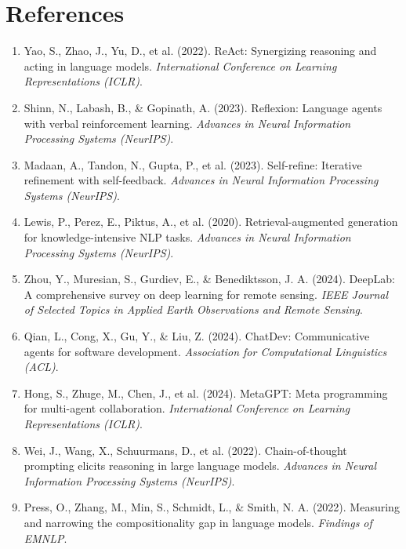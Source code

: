 \documentclass[12pt,a4paper]{article}
\begin{document}
\section*{References}
\begin{enumerate}
    \item Yao, S., Zhao, J., Yu, D., et al. (2022). ReAct: Synergizing reasoning and acting in language models. \textit{International Conference on Learning Representations (ICLR)}.

    \item Shinn, N., Labash, B., \& Gopinath, A. (2023). Reflexion: Language agents with verbal reinforcement learning. \textit{Advances in Neural Information Processing Systems (NeurIPS)}.

    \item Madaan, A., Tandon, N., Gupta, P., et al. (2023). Self-refine: Iterative refinement with self-feedback. \textit{Advances in Neural Information Processing Systems (NeurIPS)}.

    \item Lewis, P., Perez, E., Piktus, A., et al. (2020). Retrieval-augmented generation for knowledge-intensive NLP tasks. \textit{Advances in Neural Information Processing Systems (NeurIPS)}.

    \item Zhou, Y., Muresian, S., Gurdiev, E., \& Benediktsson, J. A. (2024). DeepLab: A comprehensive survey on deep learning for remote sensing. \textit{IEEE Journal of Selected Topics in Applied Earth Observations and Remote Sensing}.

    \item Qian, L., Cong, X., Gu, Y., \& Liu, Z. (2024). ChatDev: Communicative agents for software development. \textit{Association for Computational Linguistics (ACL)}.

    \item Hong, S., Zhuge, M., Chen, J., et al. (2024). MetaGPT: Meta programming for multi-agent collaboration. \textit{International Conference on Learning Representations (ICLR)}.

    \item Wei, J., Wang, X., Schuurmans, D., et al. (2022). Chain-of-thought prompting elicits reasoning in large language models. \textit{Advances in Neural Information Processing Systems (NeurIPS)}.

    \item Press, O., Zhang, M., Min, S., Schmidt, L., \& Smith, N. A. (2022). Measuring and narrowing the compositionality gap in language models. \textit{Findings of EMNLP}.


\end{enumerate}
\end{document}
